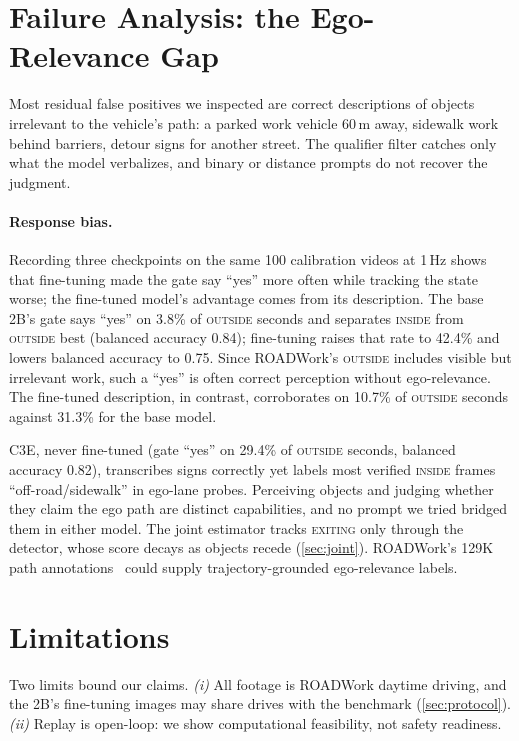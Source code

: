 \documentclass[conference]{IEEEtran}
\let\oldtextsc\textsc
\renewcommand{\textsc}[1]{\mbox{\oldtextsc{#1}}}
\begin{document}
\section{Failure Analysis: the Ego-Relevance Gap}
\label{sec:analysis}

Most residual false positives we inspected are correct descriptions of objects irrelevant to the vehicle's path: a parked work vehicle 60\,m away, sidewalk work behind barriers, detour signs for another street.  The qualifier filter catches only what the model verbalizes, and binary or distance prompts do not recover the judgment.

\paragraph{Response bias.}  Recording three checkpoints on the same 100 calibration videos at 1\,Hz shows that fine-tuning made the gate say ``yes'' more often while tracking the state worse; the fine-tuned model's advantage comes from its description.  The base 2B's gate says ``yes'' on 3.8\% of \textsc{outside} seconds and separates \textsc{inside} from \textsc{outside} best (balanced accuracy 0.84); fine-tuning raises that rate to 42.4\% and lowers balanced accuracy to 0.75.  Since ROADWork's \textsc{outside} includes visible but irrelevant work, such a ``yes'' is often correct perception without ego-relevance.  The fine-tuned description, in contrast, corroborates on 10.7\% of \textsc{outside} seconds against 31.3\% for the base model.

C3E, never fine-tuned (gate ``yes'' on 29.4\% of \textsc{outside} seconds, balanced accuracy 0.82), transcribes signs correctly yet labels most verified \textsc{inside} frames ``off-road/sidewalk'' in ego-lane probes.  Perceiving objects and judging whether they claim the ego path are distinct capabilities, and no prompt we tried bridged them in either model.  The joint estimator tracks \textsc{exiting} only through the detector, whose score decays as objects recede (\cref{sec:joint}).  ROADWork's 129K path annotations~\cite{ghosh2025roadwork} could supply trajectory-grounded ego-relevance labels.

\section{Limitations}
\label{sec:limitations}

Two limits bound our claims.  \emph{(i)} All footage is ROADWork daytime driving, and the 2B's fine-tuning images may share drives with the benchmark (\cref{sec:protocol}).  \emph{(ii)} Replay is open-loop: we show computational feasibility, not safety readiness.
\end{document}
